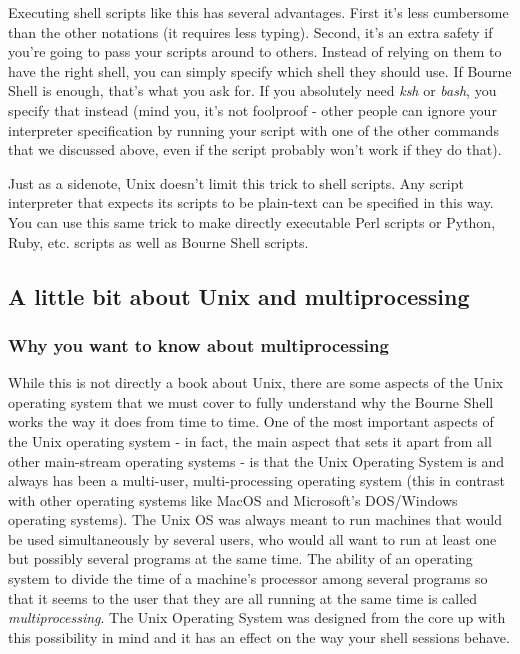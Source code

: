 Executing shell scripts like this has several advantages. First it's less
cumbersome than the other notations (it requires less typing). Second, it's an
extra safety if you're going to pass your scripts around to others. Instead of
relying on them to have the right shell, you can simply specify which shell
they should use. If Bourne Shell is enough, that's what you ask for. If you
absolutely need \textit{ksh} or \textit{bash}, you specify that instead (mind
you, it's not foolproof - other people can ignore your interpreter
specification by running your script with one of the other commands that we
discussed above, even if the script probably won't work if they do that).

Just as a sidenote, Unix doesn't limit this trick to shell scripts. Any script
interpreter that expects its scripts to be plain-text can be specified in this
way. You can use this same trick to make directly executable Perl scripts or
Python, Ruby, etc. scripts as well as Bourne Shell scripts.

\subsection{A little bit about Unix and multiprocessing}
\subsubsection{Why you want to know about multiprocessing}
While this is not directly a book about Unix, there are some aspects of the
Unix operating system that we must cover to fully understand why the Bourne
Shell works the way it does from time to time.
One of the most important aspects of the Unix operating system - in fact, the
main aspect that sets it apart from all other main-stream operating systems -
is that the Unix Operating System is and always has been a multi-user,
multi-processing operating system (this in contrast with other operating
systems like MacOS and Microsoft's DOS/Windows operating systems). The Unix OS
was always meant to run machines that would be used simultaneously by several
users, who would all want to run at least one but possibly several programs at
the same time. The ability of an operating system to divide the time of a
machine's processor among several programs so that it seems to the user that
they are all running at the same time is called \textit{multiprocessing}. The
Unix Operating System was designed from the core up with this possibility in
mind and it has an effect on the way your shell sessions behave.

